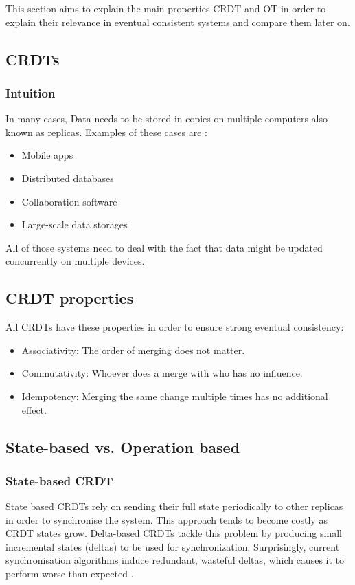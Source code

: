 This section aims to explain the main properties CRDT and OT in order to explain
their relevance in eventual consistent systems and compare them later on.

\subsection{CRDTs}

\subsubsection{Intuition}

In many cases, Data needs to be stored in copies on multiple computers also
known as replicas. Examples of these cases are \cite{CRDT_Overview}:

\begin{itemize}
    \item Mobile apps
    \item Distributed databases
    \item Collaboration software
    \item Large-scale data storages
\end{itemize}

All of those systems need to deal with the fact that data might be updated
concurrently on multiple devices.

\subsection{CRDT properties}

All CRDTs have these properties in order to ensure strong eventual consistency:

\begin{itemize}
    \item Associativity: The order of merging does not matter.
    \item Commutativity: Whoever does a merge with who has no influence.
    \item Idempotency: Merging the same change multiple times has no additional effect.
\end{itemize}

\subsection{State-based vs. Operation based}

\subsubsection{State-based CRDT}
State based CRDTs rely on sending their full state periodically to other
replicas in order to synchronise the system. This approach tends to become costly
as CRDT states grow. Delta-based CRDTs tackle this problem
by producing small incremental states (deltas) to be used for synchronization. Surprisingly,
current synchronisation algorithms induce redundant, wasteful deltas, which causes it to
perform worse than expected \cite{Stateful_delta}.

